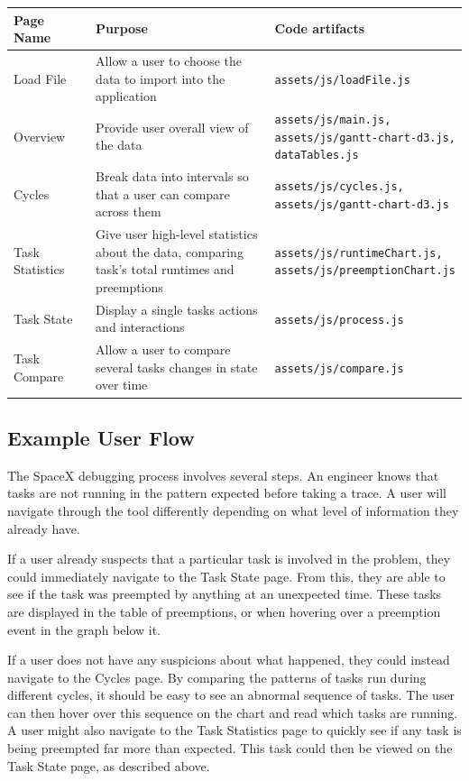 \documentclass{hmcclinic}
\begin{document}
  \begin{center}
    \begin{tabular}{p{0.2\linewidth}p{0.5\linewidth}p{0.3\linewidth}}
     \toprule
      Page Name       & Purpose & Code artifacts     \\
      \midrule
      Load File       & Allow a user to choose the data to import into the
      application        & \texttt{assets/js/loadFile.js}\\
      Overview        & Provide user overall view of the data        &
      \texttt{assets/js/main.js, assets/js/gantt-chart-d3.js, dataTables.js}\\
      Cycles          & Break data into intervals so that a user can compare
      across them        & \texttt{assets/js/cycles.js,
      assets/js/gantt-chart-d3.js}\\
      Task Statistics & Give user high-level statistics about the data,
      comparing task's total runtimes and preemptions        &
      \texttt{assets/js/runtimeChart.js, assets/js/preemptionChart.js}\\
      Task State      & Display a single tasks actions and interactions
      & \texttt{assets/js/process.js}\\
      Task Compare    & Allow a user to compare several tasks changes in state
      over time     & \texttt{assets/js/compare.js}\\
    \bottomrule
    \end{tabular}
  \end{center}

\subsection{Example User Flow}
  The SpaceX debugging process involves several steps. 
  An engineer knows that tasks are not running in the
  pattern expected before taking a trace. A user will navigate through the tool
  differently depending on what level of information they already have.

  If a user already suspects that a particular task is involved
  in the problem, they could immediately navigate to the Task State page. From
  this, they are able to see if the task was preempted by anything
  at an unexpected time. These tasks are displayed in the table of
  preemptions, or when hovering over a preemption event in the graph below it.

  If a user does not have any suspicions about what happened, they could instead
  navigate to the Cycles page. By comparing the patterns of tasks run during
  different cycles, it should be easy to see an abnormal sequence of tasks. The
  user can then hover over this sequence on the chart and read which tasks are
  running. A user might also navigate to the Task Statistics page to quickly see
  if any task is being preempted far more than expected. This task could then be
  viewed on the Task State page, as described above.
\end{document}
